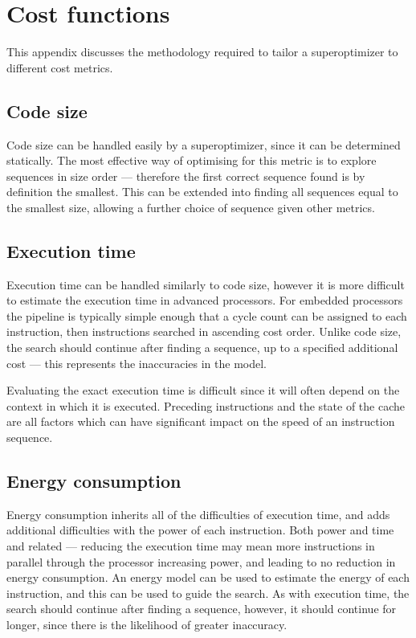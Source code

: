 \documentclass{article}
\begin{document}
\newpage
\appendix
\section{Cost functions}
This appendix discusses the methodology required to tailor a superoptimizer to different cost metrics.

\subsection{Code size}
Code size can be handled easily by a superoptimizer, since it can be determined statically. The most effective way of optimising for this metric is to explore sequences in size order --- therefore the first correct sequence found is by definition the smallest. This can be extended into finding all sequences equal to the smallest size, allowing a further choice of sequence given other metrics.

\subsection{Execution time}

Execution time can be handled similarly to code size, however it is more difficult to estimate the execution time in advanced processors. For embedded processors the pipeline is typically simple enough that a cycle count can be assigned to each instruction, then instructions searched in ascending cost order. Unlike code size, the search should continue after finding a sequence, up to a specified additional cost --- this represents the inaccuracies in the model.

Evaluating the exact execution time is difficult since it will often depend on the context in which it is executed. Preceding instructions and the state of the cache are all factors which can have significant impact on the speed of an instruction sequence.

\subsection{Energy consumption}
Energy consumption inherits all of the difficulties of execution time, and adds additional difficulties with the power of each instruction. Both power and time and related --- reducing the execution time may mean more instructions in parallel through the processor increasing power, and leading to no reduction in energy consumption. An energy model can be used to estimate the energy of each instruction, and this can be used to guide the search. As with execution time, the search should continue after finding a sequence, however, it should continue for longer, since there is the likelihood of greater inaccuracy.
\end{document}
